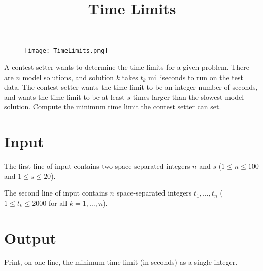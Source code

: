 \documentclass{article}
\title{Time Limits}
\date{}
\begin{document}
\maketitle
\begin{figure}[h!]
\centering
\texttt{[image: TimeLimits.png]}
\end{figure}


A contest setter wants to determine the time limits for a given
problem. There are $n$ model solutions, and solution $k$ takes $t_k$
milliseconds to run on the test data. The contest setter
wants the time limit to be an integer number of seconds, and wants
the time limit to be at least $s$ times larger than the slowest model
solution. Compute the minimum time limit the contest setter can
set.

\section{Input}

The first line of input contains two space-separated integers $n$ and $s$ ($1 \le n \le 100$ and $1 \le s \le 20$).

The second line of input contains $n$ space-separated integers $t_1, \ldots, t_n$ ($1 \le t_k \le 2000$ for all $k=1, \ldots, n$).

\section{Output}

Print, on one line, the minimum time limit (in seconds) as a single integer.

\end{document}
